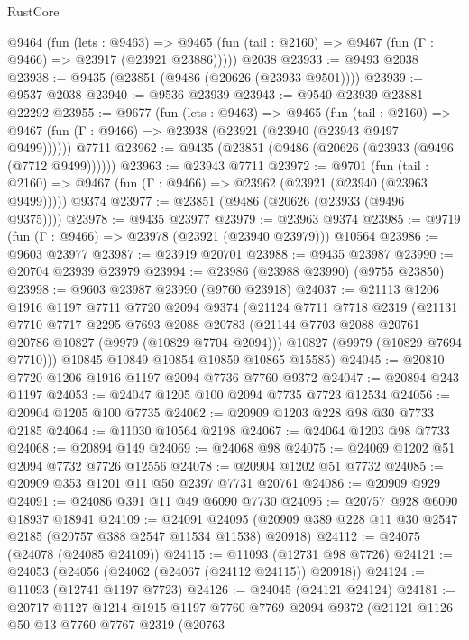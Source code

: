 \begin{lexlean}{RustCore}
\begin{coremodule}
    @9464
      (fun (lets : @9463) =>
      @9465 (fun (tail : @2160) => @9467 (fun (Γ : @9466) => @23917 (@23921 @23886)))))
    @2038
@23933 := @9493 @2038
@23938 := @9435 (@23851 (@9486 (@20626 (@23933 @9501))))
@23939 := @9537 @2038
@23940 := @9536 @23939
@23943 := @9540 @23939 @23881 @22292
@23955 := @9677
    (fun (lets : @9463) =>
    @9465
      (fun (tail : @2160) =>
      @9467 (fun (Γ : @9466) => @23938 (@23921 (@23940 (@23943 @9497 @9499))))))
    @7711
@23962 := @9435 (@23851 (@9486 (@20626 (@23933 (@9496 (@7712 @9499))))))
@23963 := @23943 @7711
@23972 := @9701
    (fun (tail : @2160) => @9467 (fun (Γ : @9466) => @23962 (@23921 (@23940 (@23963 @9499)))))
    @9374
@23977 := @23851 (@9486 (@20626 (@23933 (@9496 @9375))))
@23978 := @9435 @23977
@23979 := @23963 @9374
@23985 := @9719 (fun (Γ : @9466) => @23978 (@23921 (@23940 @23979))) @10564
@23986 := @9603 @23977
@23987 := @23919 @20701
@23988 := @9435 @23987
@23990 := @20704 @23939 @23979
@23994 := @23986 (@23988 @23990) (@9755 @23850)
@23998 := @9603 @23987 @23990 (@9760 @23918)
@24037 := @21113
    @1206
    @1916
    @1197
    @7711
    @7720
    @2094
    @9374
    (@21124
      @7711
      @7718
      @2319
      (@21131
        @7710
        @7717
        @2295
        @7693
        @2088
        @20783
        (@21144 @7703 @2088 @20761 @20786 @10827 (@9979 (@10829 @7704 @2094)))
        @10827
        (@9979 (@10829 @7694 @7710)))
      @10845
      @10849
      @10854
      @10859
      @10865
      @15585)
@24045 := @20810 @7720 @1206 @1916 @1197 @2094 @7736 @7760 @9372
@24047 := @20894 @243 @1197
@24053 := @24047 @1205 @100 @2094 @7735 @7723 @12534
@24056 := @20904 @1205 @100 @7735
@24062 := @20909 @1203 @228 @98 @30 @7733 @2185
@24064 := @11030 @10564 @2198
@24067 := @24064 @1203 @98 @7733
@24068 := @20894 @149
@24069 := @24068 @98
@24075 := @24069 @1202 @51 @2094 @7732 @7726 @12556
@24078 := @20904 @1202 @51 @7732
@24085 := @20909 @353 @1201 @11 @50 @2397 @7731 @20761
@24086 := @20909 @929
@24091 := @24086 @391 @11 @49 @6090 @7730
@24095 := @20757 @928 @6090 @18937 @18941
@24109 := @24091
    @24095
    (@20909 @389 @228 @11 @30 @2547 @2185 (@20757 @388 @2547 @11534 @11538) @20918)
@24112 := @24075 (@24078 (@24085 @24109))
@24115 := @11093 (@12731 @98 @7726)
@24121 := @24053 (@24056 (@24062 (@24067 (@24112 @24115)) @20918))
@24124 := @11093 (@12741 @1197 @7723)
@24126 := @24045 (@24121 @24124)
@24181 := @20717
    @1127
    @1214
    @1915
    @1197
    @7760
    @7769
    @2094
    @9372
    (@21121
      @1126
      @50
      @13
      @7760
      @7767
      @2319
      (@20763

\end{coremodule}
\end{lexlean}
